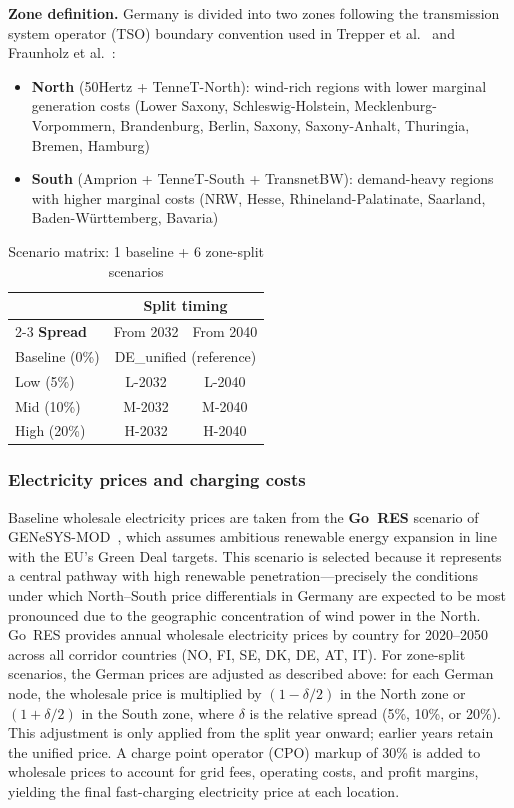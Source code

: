 \documentclass[conference]{IEEEtran}
\begin{document}
\textbf{Zone definition.}
Germany is divided into two zones following the transmission system operator (TSO) boundary convention used in Trepper et al.~\cite{b_trepper2015} and Fraunholz et al.~\cite{b_fraunholz2021}:
\begin{itemize}
    \item \textbf{North} (50Hertz + TenneT-North): wind-rich regions with lower marginal generation costs (Lower Saxony, Schleswig-Holstein, Mecklenburg-Vorpommern, Brandenburg, Berlin, Saxony, Saxony-Anhalt, Thuringia, Bremen, Hamburg)
    \item \textbf{South} (Amprion + TenneT-South + TransnetBW): demand-heavy regions with higher marginal costs (NRW, Hesse, Rhineland-Palatinate, Saarland, Baden-W\"urttemberg, Bavaria)
\end{itemize}

\begin{table}[htbp]
\caption{Scenario matrix: 1 baseline + 6 zone-split scenarios}
\label{tab:scenarios}
\begin{center}
\begin{tabular}{l c c}
\toprule
 & \multicolumn{2}{c}{\textbf{Split timing}} \\
\cmidrule(lr){2-3}
\textbf{Spread} & From 2032 & From 2040 \\
\midrule
Baseline (0\%) & \multicolumn{2}{c}{DE\_unified (reference)} \\
\midrule
Low (5\%)  & L-2032 & L-2040 \\
Mid (10\%) & M-2032 & M-2040 \\
High (20\%) & H-2032 & H-2040 \\
\bottomrule
\end{tabular}
\end{center}
\end{table}

\subsubsection{Electricity prices and charging costs}
Baseline wholesale electricity prices are taken from the \textbf{Go~RES} scenario of GENeSYS-MOD~\cite{b_genesys}, which assumes ambitious renewable energy expansion in line with the EU's Green Deal targets. This scenario is selected because it represents a central pathway with high renewable penetration---precisely the conditions under which North--South price differentials in Germany are expected to be most pronounced due to the geographic concentration of wind power in the North. Go~RES provides annual wholesale electricity prices by country for 2020--2050 across all corridor countries (NO, FI, SE, DK, DE, AT, IT). For zone-split scenarios, the German prices are adjusted as described above: for each German node, the wholesale price is multiplied by $(1 - \delta/2)$ in the North zone or $(1 + \delta/2)$ in the South zone, where $\delta$ is the relative spread (5\%, 10\%, or 20\%). This adjustment is only applied from the split year onward; earlier years retain the unified price. A charge point operator (CPO) markup of 30\% is added to wholesale prices to account for grid fees, operating costs, and profit margins, yielding the final fast-charging electricity price at each location.
\end{document}
